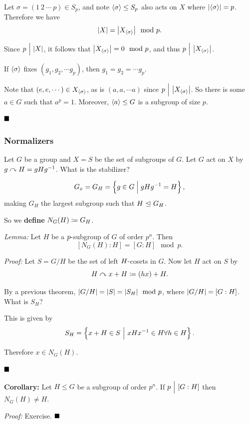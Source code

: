 Let \(\sigma = (1~2~\cdots~p) \in S_p\), and note
\(\left\langle{\sigma}\right\rangle \leq S_p\) also acts on \(X\) where
\({\left\lvert {\left\langle{\sigma}\right\rangle} \right\rvert} = p\). Therefore we have \[
{\left\lvert {X} \right\rvert} = {\left\lvert {X_{\left\langle{\sigma}\right\rangle}} \right\rvert} \mod p.
\]

Since \(p{~\Bigm| ~} {\left\lvert {X} \right\rvert}\), it follows that
\({\left\lvert {X_{\left\langle{\sigma}\right\rangle}} \right\rvert} = 0 \mod p\), and thus
\(p {~\Bigm| ~} {\left\lvert {X_{\left\langle{\sigma}\right\rangle}} \right\rvert}\).

If \(\left\langle{\sigma}\right\rangle\) fixes \((g_1, g_2, \cdots g_p)\), then
\(g_1 = g_2 = \cdots g_p\).

Note that \((e, e, \cdots) \in X_{\left\langle{\sigma}\right\rangle}\), as is
\((a, a, \cdots a)\) since \(p {~\Bigm| ~} {\left\lvert {X_{\left\langle{\sigma}\right\rangle}} \right\rvert}\).
So there is some \(a\in G\) such that \(a^p = 1\). Moreover,
\(\left\langle{a}\right\rangle \leq G\) is a subgroup of size \(p\).

\(\qed\)

\hypertarget{normalizers}{%
\subsubsection{Normalizers}\label{normalizers}}

Let \(G\) be a group and \(X = S\) be the set of subgroups of \(G\). Let
\(G\) act on \(X\) by \(g\curvearrowright H = gHg^{-1}\). What is the stabilizer?

\[
G_x = G_H = \left\{{g\in G \mathrel{\Big|} gHg^{-1} = H}\right\}
,\] making \(G_H\) the largest subgroup such that \(H {~\trianglelefteq~} G_H\).

So we \textbf{define} \(N_G(H) \coloneqq G_H\).

\emph{Lemma:} Let \(H\) be a \(p{\hbox{-}}\)subgroup of \(G\) of order
\(p^n\). Then \[
[N_G(H) : H] = [G : H] \mod p
.\]

\emph{Proof:} Let \(S = G/H\) be the set of left \(H{\hbox{-}}\)cosets in
\(G\). Now let \(H\) act on \(S\) by \[
H\curvearrowright x + H \coloneqq (hx) + H
.\]

By a previous theorem, \({\left\lvert {G/H} \right\rvert} = {\left\lvert {S} \right\rvert} = {\left\lvert {S_H} \right\rvert} \mod p\), where
\({\left\lvert {G/H} \right\rvert} = [G: H]\). What is \(S_H\)?

This is given by \[
S_H = \left\{{x + H \in S {~\mathrel{\Big|}~} xHx^{-1} \in H \forall h\in H}\right\}
.\]

Therefore \(x\in N_G(H)\).

\(\qed\)

\textbf{Corollary:} Let \(H \leq G\) be a subgroup of order \(p^n\). If
\(p {~\Bigm| ~} [G: H]\) then \(N_G(H) \neq H\).

\emph{Proof:} Exercise. \(\qed\)

